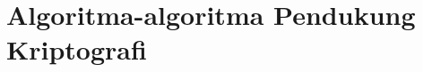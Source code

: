 \documentclass[../main.tex]{subfiles}
\begin{document}
\chapter{Algoritma-algoritma Pendukung Kriptografi}
\end{document}
